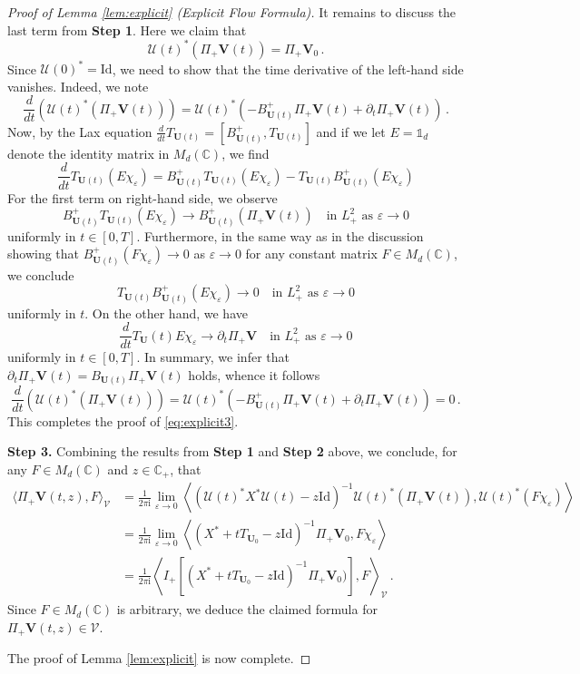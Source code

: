 \documentclass[11pt,reqno]{amsart}
\theoremstyle{definition}
\theoremstyle{remark}
\theoremstyle{remark}
\numberwithin{equation}{section}
\newcommand{\C}{\mathbb{C}}
\newcommand{\UU}{\mathcal{U}}
\newcommand{\VV}{\mathcal{V}}
\newcommand{\pt}{\partial}
\newcommand{\be}{\begin{equation}}
\newcommand{\ee}{\end{equation}}
\newcommand{\eps}{\varepsilon}
\newcommand{\ii}{\mathrm{i}}
\newcommand{\Vb}{\mathbf{V}}
\newcommand{\Ub}{\mathbf{U}}
\newcommand{\id}{\mathrm{Id}}
\begin{document}
\begin{proof}[Proof of Lemma \ref{lem:explicit} (Explicit Flow Formula)]
It remains to discuss the last term from \textbf{Step 1}. Here we claim that
\be \label{eq:explicit3}
\UU(t)^* (\Pi_+ \Vb(t)) = \Pi_+ \Vb_0 \, .
\ee
Since $\UU(0)^* = \id$, we need to show that the time derivative of the left-hand side vanishes. Indeed, we note
$$
\frac{d}{dt} \left ( \UU(t)^*(\Pi_+ \Vb(t)) \right ) = \UU(t)^* \left ( -B_{\Ub(t)}^+ \Pi_+ \Vb(t) +  \pt_t  \Pi_+ \Vb(t) \right ) \, .
$$ 
Now, by the Lax equation $\frac{d}{dt} T_{\Ub(t)} = [B_{\Ub(t)}^+, T_{\Ub(t)}]$ and if we let $E=\mathds{1}_d$ denote the identity matrix in $M_d(\C)$, we find
$$
\frac{d}{dt} T_{\Ub(t)} (E \chi_\eps) = B_{\Ub(t)}^+ T_{\Ub(t)} (E \chi_\eps) - T_{\Ub(t)} B_{\Ub(t)}^+ (E \chi_\eps)
$$
For the first term on right-hand side, we observe
$$
B_{\Ub(t)}^+ T_{\Ub(t)} (E \chi_\eps) \to B_{\Ub(t)}^+ (\Pi_+ \Vb(t)) \quad \mbox{in $L^2_+$ as $\eps \to 0$}
$$
uniformly in $t \in [0,T]$. Furthermore, in the same way as in the discussion showing that $B_{\Ub(t)}^+ (F \chi_\eps) \to 0$ as $\eps \to 0$ for any constant matrix $F \in M_d(\C)$, we conclude
$$
T_{\Ub(t)} B_{\Ub(t)}^+(E \chi_\eps) \to 0 \quad \mbox{in $L^2_+$ as $\eps \to 0$}
$$
uniformly in $t$. On the other hand, we have 
$$
\frac{d}{dt} T_{\Ub}(t) E \chi_\eps \to \pt_t \Pi_+ \Vb  \quad \mbox{in $L^2_+$ as $\eps \to 0$}
$$
 uniformly in $t \in [0,T]$. In summary, we infer that $\pt_t \Pi_+ \Vb(t) = B_{\Ub(t)} \Pi_+ \Vb(t)$ holds, whence it follows 
$$
\frac{d}{dt}  \left ( \UU(t)^* (\Pi_+ \Vb(t)) \right ) = \UU(t)^* (-B_{\Ub(t)}^+ \Pi_+ \Vb(t) + \pt_t \Pi_+ \Vb(t) ) =  0 \, .
$$
This completes the proof of \eqref{eq:explicit3}.

\medskip
\textbf{Step 3.} Combining the results from \textbf{Step 1} and \textbf{Step 2} above, we conclude, for any $F \in M_d(\C)$ and $z \in \C_+$, that
\begin{align*}
\langle \Pi_+ \Vb(t,z), F \rangle_\VV & = \frac{1}{2 \pi \ii} \lim_{\eps \to 0} \left \langle (\UU(t)^* X^* \UU(t) - z \id)^{-1} \UU(t)^* (\Pi_+ \Vb(t)), \UU(t)^*(F \chi_\eps) \right  \rangle \, \\
& = \frac{1}{2 \pi \ii} \lim_{\eps \to 0} \left \langle (X^*+ t T_{\Ub_0} - z \id)^{-1} \Pi_+ \Vb_0, F \chi_\eps \right \rangle \\
& = \frac{1}{2 \pi \ii}\left \langle  I_+[(X^*+tT_{\Ub_0} - z \id)^{-1} \Pi_+ \Vb_0)], F \right \rangle_\VV \, .
\end{align*}
Since $F \in M_d(\C)$ is arbitrary, we deduce the claimed formula for $\Pi_+ \Vb(t,z) \in \VV$. 

The proof of Lemma \ref{lem:explicit} is now complete.
\end{proof}
\end{document}
